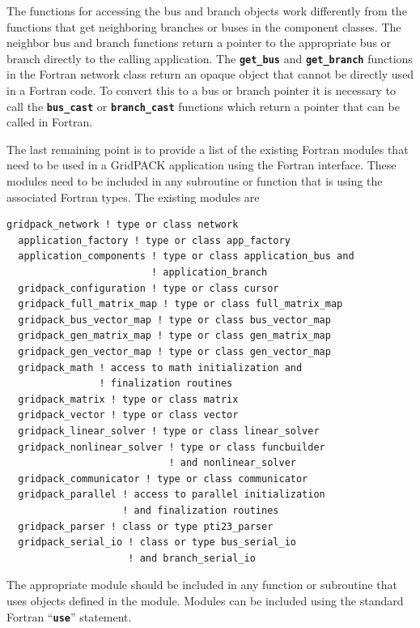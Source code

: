 \documentclass[12pt]{report} %
\begin{document}
The functions for accessing the bus and branch objects work differently from the functions that get neighboring branches or buses in the component classes. The neighbor bus and branch functions return a pointer to the appropriate bus or branch directly to the calling application. The \texttt{\textbf{get\_bus}} and \texttt{\textbf{get\_branch}} functions in the Fortran network class return an opaque object that cannot be directly used in a Fortran code. To convert this to  a bus or branch pointer it is necessary to call the \texttt{\textbf{bus\_cast}} or \texttt{\textbf{branch\_cast}} functions which return a pointer that can be called in Fortran.

The last remaining point is to provide a list of the existing Fortran modules that need to be used in a GridPACK application using the Fortran interface. These modules need to be included in any subroutine or function that is using the associated Fortran types. The existing modules are

{
\color{red}
\begin{Verbatim}[fontseries=b]
  gridpack_network ! type or class network
  application_factory ! type or class app_factory
  application_components ! type or class application_bus and
                         ! application_branch
  gridpack_configuration ! type or class cursor
  gridpack_full_matrix_map ! type or class full_matrix_map
  gridpack_bus_vector_map ! type or class bus_vector_map
  gridpack_gen_matrix_map ! type or class gen_matrix_map
  gridpack_gen_vector_map ! type or class gen_vector_map
  gridpack_math ! access to math initialization and
                ! finalization routines
  gridpack_matrix ! type or class matrix
  gridpack_vector ! type or class vector
  gridpack_linear_solver ! type or class linear_solver
  gridpack_nonlinear_solver ! type or class funcbuilder
                            ! and nonlinear_solver
  gridpack_communicator ! type or class communicator
  gridpack_parallel ! access to parallel initialization
                    ! and finalization routines
  gridpack_parser ! class or type pti23_parser
  gridpack_serial_io ! class or type bus_serial_io
                     ! and branch_serial_io
\end{Verbatim}
}

The appropriate module should be included in any function or subroutine that uses objects defined in the module. Modules can be included using the standard Fortran ``\texttt{\textbf{use}}'' statement.
\end{document}
